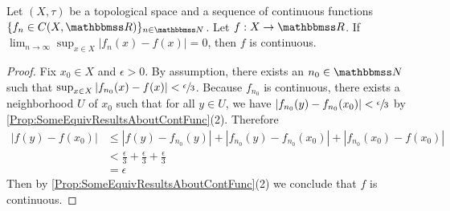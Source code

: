\documentclass[screen,single]{techreport}
\numberwithin{equation}{section}
\begin{document}
\begin{lemma}\label{Lem:UniformContinuous}
	Let $(X,\tau)$ be a topological space and a sequence of continuous functions $\{f_n \in C(X,\bbR)\}_{n \in \bbN}$.
	Let $f : X \to \bbR$.
	If $\lim_{n \to \infty} \sup_{x \in X} |f_n(x) - f(x)| = 0$, then $f$ is continuous.
\end{lemma}
\begin{proof}
	Fix $x_0 \in X$ and $\epsilon > 0$.
	By assumption, there exists an $n_0 \in \bbN$ such that $\sup_{x \in X} |f_{n_0}(x) - f(x)| < \sfrac{\epsilon}{3}$.
	Because $f_{n_0}$ is continuous, there exists a neighborhood $U$ of $x_0$ such that for all $y \in U$, we have $|f_{n_0}(y) - f_{n_0}(x_0)| < \sfrac{\epsilon}{3}$ by \cref{Prop:SomeEquivResultsAboutContFunc}(2).
	Therefore
	\begin{align*}
		|f(y) - f(x_0)| & \le |f(y) - f_{n_0}(y)| + |f_{n_0}(y) - f_{n_0}(x_0)| + |f_{n_0}(x_0) - f(x_0)| \\
		& < \frac{\epsilon}{3} + \frac{\epsilon}{3} + \frac{\epsilon}{3} \\
		& = \epsilon
	\end{align*}
	Then by \cref{Prop:SomeEquivResultsAboutContFunc}(2) we conclude that $f$ is continuous.
\end{proof}
\end{document}
